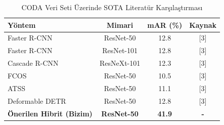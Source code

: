 \begin{table}[htbp]
\caption{CODA Veri Seti Üzerinde SOTA Literatür Karşılaştırması}
\label{tab:sota_comparison}
\centering
\begin{tabular}{lccc}
\hline
\textbf{Yöntem} & \textbf{Mimari} & \textbf{mAR (\%)} & \textbf{Kaynak} \\ \hline
Faster R-CNN & ResNet-50 & 12.8 & [3] \\
Faster R-CNN & ResNet-101 & 12.8 & [3] \\
Cascade R-CNN & ResNeXt-101 & 12.3 & [3] \\
FCOS & ResNet-50 & 10.5 & [3] \\
ATSS & ResNet-50 & 11.1 & [3] \\
Deformable DETR & ResNet-50 & 12.8 & [3] \\
\hline
\textbf{Önerilen Hibrit (Bizim)} & \textbf{ResNet-50} & \textbf{41.9} & \textbf{-} \\
\hline
\end{tabular}
\end{table}
